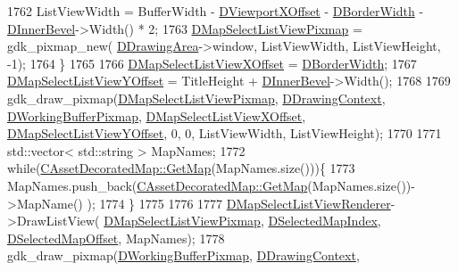 \begin{DoxyCode}
1762         ListViewWidth = BufferWidth - \hyperlink{classCApplicationData_a306bba873ccc47126111305fe21ef3ff}{DViewportXOffset} - 
      \hyperlink{classCApplicationData_a566b69c72fa982c6ecf8e47dc21df489}{DBorderWidth} - \hyperlink{classCApplicationData_a29a687c44dceb9e87a56d96612d59ab5}{DInnerBevel}->Width() * 2;
1763         \hyperlink{classCApplicationData_a76e4af228d69ca3c6b1cf0770ca2e7a0}{DMapSelectListViewPixmap} = gdk\_pixmap\_new(
      \hyperlink{classCApplicationData_a4735f5d31632313e0b2a1659eb178987}{DDrawingArea}->window, ListViewWidth, ListViewHeight, -1);
1764     \}
1765     
1766     \hyperlink{classCApplicationData_aa5a89b442e384acdf1c2aefc7ce4233b}{DMapSelectListViewXOffset} = \hyperlink{classCApplicationData_a566b69c72fa982c6ecf8e47dc21df489}{DBorderWidth};
1767     \hyperlink{classCApplicationData_ae1a8eb3fff3cf5bc236564925bec1c8c}{DMapSelectListViewYOffset} = TitleHeight + 
      \hyperlink{classCApplicationData_a29a687c44dceb9e87a56d96612d59ab5}{DInnerBevel}->Width();
1768     
1769     gdk\_draw\_pixmap(\hyperlink{classCApplicationData_a76e4af228d69ca3c6b1cf0770ca2e7a0}{DMapSelectListViewPixmap}, 
      \hyperlink{classCApplicationData_aa6c5bea9bdcc64398e5a3f693661d37c}{DDrawingContext}, \hyperlink{classCApplicationData_afa34cf2780f38dd28c0c811e69d60a97}{DWorkingBufferPixmap}, 
      \hyperlink{classCApplicationData_aa5a89b442e384acdf1c2aefc7ce4233b}{DMapSelectListViewXOffset}, \hyperlink{classCApplicationData_ae1a8eb3fff3cf5bc236564925bec1c8c}{DMapSelectListViewYOffset}, 0, 
      0, ListViewWidth, ListViewHeight);
1770     
1771     std::vector< std::string > MapNames;       
1772     \textcolor{keywordflow}{while}(\hyperlink{classCAssetDecoratedMap_afafb067884070fe0340f8b7e63bdc099}{CAssetDecoratedMap::GetMap}(MapNames.size()))\{
1773         MapNames.push\_back(\hyperlink{classCAssetDecoratedMap_afafb067884070fe0340f8b7e63bdc099}{CAssetDecoratedMap::GetMap}(MapNames.size())->MapName()
      );
1774     \}
1775 
1776     
1777     \hyperlink{classCApplicationData_a5e5746ba44c03038d1a392872614de14}{DMapSelectListViewRenderer}->DrawListView(
      \hyperlink{classCApplicationData_a76e4af228d69ca3c6b1cf0770ca2e7a0}{DMapSelectListViewPixmap}, \hyperlink{classCApplicationData_a279cfd90004e3f1b90b119358ff25586}{DSelectedMapIndex}, 
      \hyperlink{classCApplicationData_a443edd0c2c7964fc51a82bf2a016725b}{DSelectedMapOffset}, MapNames);
1778     gdk\_draw\_pixmap(\hyperlink{classCApplicationData_afa34cf2780f38dd28c0c811e69d60a97}{DWorkingBufferPixmap}, \hyperlink{classCApplicationData_aa6c5bea9bdcc64398e5a3f693661d37c}{DDrawingContext}, 

\end{DoxyCode}
